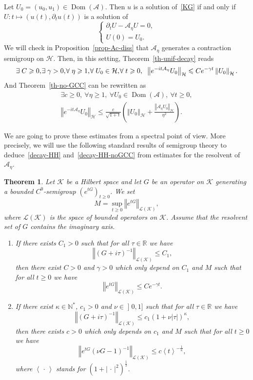 \documentclass[11pt]{article}
\newtheorem{theo}{Theorem}[section]
\theoremstyle{definition}
\numberwithin{equation}{section}
\numberwithin{figure}{section}
\numberwithin{table}{section}
\newcommand{\abs}[1]{\left\vert #1\right\vert}
\newcommand{\nr}[1]{\left\Vert #1\right\Vert}
\newcommand{\pppg}[1] {\left< #1 \right>}
\renewcommand{\leq}{\leqslant}
\renewcommand{\geq}{\geqslant}
\newcommand{\inv}{^{-1}}
\newcommand{\1}{\mathds 1}
\DeclareMathOperator{\Dom}{Dom}
\newcommand{\R}{\mathbb{R}}
\newcommand{\N}{\mathbb{N}}
\newcommand{\g}{\gamma}
\renewcommand{\t}{\tau}
\newcommand{\Ac}{{\mathcal A}}
\newcommand{\Kc}{{\mathcal K}}
\newcommand{\Lc}{{\mathcal L}}
\newcommand{\HH}{\mathcal H}
\newcommand*{\Mk}{\mkern -2mu}
\let\oldexists\exists
\renewcommand*{\exists}{\mathrel{\oldexists}}
\let\oldforall\forall
\renewcommand*{\forall}{\mathrel{\oldforall}}
\begin{document}
Let $U_0 = (u_0,u_1) \in \Dom(\Ac)$. Then $u$ is a solution of~\eqref{KG} if and only if $U : t \mapsto (u(t),\partial_t u(t))$ is a solution of
\begin{equation}\label{KG-Ac}
\begin{cases}
\partial_t U - \Ac_\eta U = 0,\\
U(0) = U_0.
\end{cases}
\end{equation}
We will check in Proposition~\ref{prop-Ac-diss} that $\Ac_\eta$ generates a contraction semigroup on $\HH$. Then, in this setting, Theorem~\ref{th-unif-decay} reads
\begin{equation}\label{decay-HH}
\exists C \geq 0,\Mk \exists \gamma > 0,\Mk \forall \eta \geq 1,\Mk \forall U_0 \in \HH,\Mk \forall t \geq 0, \;\; \nr{e^{-it\Ac_\eta} U_0}_{\HH} \leq C e^{-\g t} \nr{U_0}_{\HH}.
\end{equation}
And Theorem~\ref{th-no-GCC} can be rewritten as
\begin{multline}\label{decay-HH-noGCC}
\exists c \geq 0,\ \forall \eta \geq 1,\ \forall U_0 \in \Dom(\Ac),\ \forall t \geq 0,
\\ \nr{e^{-it\Ac_\eta} U_0}_{\HH} \leq \frac c {\sqrt{1+t}} \left(\nr{U_0}_\HH + \frac {\nr{\Ac_\eta U_0}_{\HH}}{\eta^2} \right).
\end{multline}

We are going to prove these estimates from a spectral point of view. More precisely, we will use the following standard results of semigroup theory to deduce~\eqref{decay-HH} and~\eqref{decay-HH-noGCC} from estimates for the resolvent of $\Ac_\eta$.

\begin{theo}\label{th-GPH-BT}
Let $\Kc$ be a Hilbert space and let $G$ be an operator on $\Kc$ generating a bounded $C^0$-semigroup $(e^{tG})_{t \geq 0}$. We set
\[
M = \sup_{t \geq 0} \nr{e^{tG}}_{\Lc(\Kc)},
\]
where $\Lc(\Kc)$ is the space of bounded operators on $\Kc$. Assume that the resolvent set of $G$ contains the imaginary axis.
\begin{enumerate}%
\item If there exists $C_1 > 0$ such that for all $\t \in \R$ we have
\[
\nr{(G+i\t)\inv}_{\Lc(\Kc)} \leq C_1,
\]
then there exist $C > 0$ and $\gamma > 0$ which only depend on $C_1$ and $M$ such that for all $t \geq 0$ we have
\[
\nr{e^{tG}}_{\Lc(\Kc)} \leq C e^{-\gamma t}.
\]
\item If there exist $\kappa \in \N^*$, $c_1 > 0$ and $\nu \in\mathopen{]}0,1]$ such that for all $\t \in \R$ we have
\[
\nr{(G+i\t)\inv}_{\Lc(\Kc)} \leq c_1 (1+ \nu \abs \t)^{\kappa},
\]
then there exists $c > 0$ which only depends on $c_1$ and $M$ such that for all $t \geq 0$ we have
\[
\nr{e^{tG}(\nu G - 1)\inv}_{\Lc(\Kc)} \leq c \pppg t^{-\frac 1 \kappa},
\]
where $\pppg{\,\cdot\,}$ stands for $(1+\abs{\,\cdot\,}^2)^{\frac 12}$.
\end{enumerate}
\end{theo}
\end{document}
